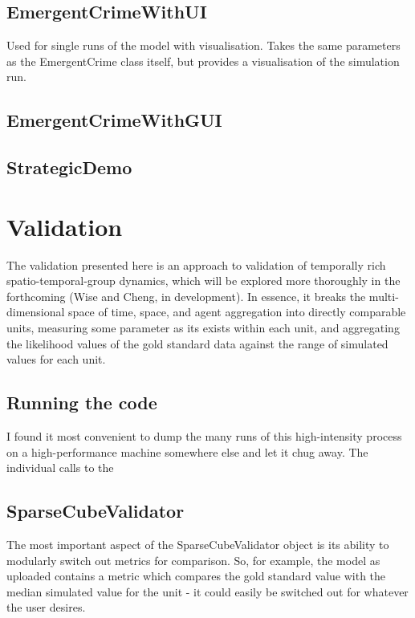 \documentclass[11pt]{article} %
\begin{document}
\subsection{EmergentCrimeWithUI}

Used for single runs of the model with visualisation. Takes the same parameters as the EmergentCrime class itself, but provides a visualisation of the simulation run. 

\subsection{EmergentCrimeWithGUI}

\subsection{StrategicDemo}



\section{Validation}

The validation presented here is an approach to validation of temporally rich spatio-temporal-group dynamics, which will be explored more thoroughly in the forthcoming (Wise and Cheng, in development). In essence, it breaks the multi-dimensional space of time, space, and agent aggregation into directly comparable units, measuring some parameter as its exists within each unit, and aggregating the likelihood values of the gold standard data against the range of simulated values for each unit.


\subsection{Running the code}

I found it most convenient to dump the many runs of this high-intensity process on a high-performance machine somewhere else and let it chug away. The individual calls to the 

\subsection{SparseCubeValidator}

The most important aspect of the SparseCubeValidator object is its ability to modularly switch out metrics for comparison. So, for example, the model as uploaded contains a metric which compares the gold standard value with the median simulated value for the unit - it could easily be switched out for whatever the user desires.
\end{document}
